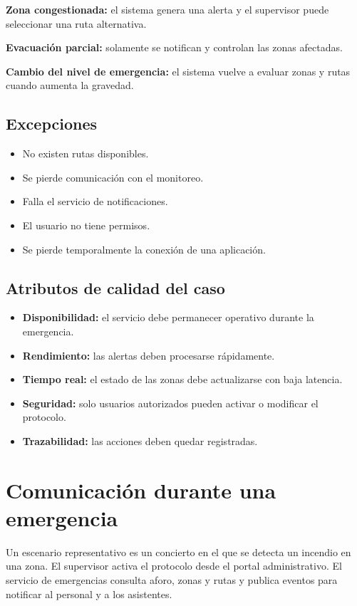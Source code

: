 \documentclass[12pt,a4paper]{article}
\begin{document}
\textbf{Zona congestionada:} el sistema genera una alerta y el supervisor puede seleccionar una ruta alternativa.

\textbf{Evacuación parcial:} solamente se notifican y controlan las zonas afectadas.

\textbf{Cambio del nivel de emergencia:} el sistema vuelve a evaluar zonas y rutas cuando aumenta la gravedad.

\subsection{Excepciones}

\begin{itemize}
\item No existen rutas disponibles.
\item Se pierde comunicación con el monitoreo.
\item Falla el servicio de notificaciones.
\item El usuario no tiene permisos.
\item Se pierde temporalmente la conexión de una aplicación.
\end{itemize}

\subsection{Atributos de calidad del caso}

\begin{itemize}
\item \textbf{Disponibilidad:} el servicio debe permanecer operativo durante la emergencia.
\item \textbf{Rendimiento:} las alertas deben procesarse rápidamente.
\item \textbf{Tiempo real:} el estado de las zonas debe actualizarse con baja latencia.
\item \textbf{Seguridad:} solo usuarios autorizados pueden activar o modificar el protocolo.
\item \textbf{Trazabilidad:} las acciones deben quedar registradas.
\end{itemize}

\section{Comunicación durante una emergencia}

Un escenario representativo es un concierto en el que se detecta un incendio en una zona. El supervisor activa el protocolo desde el portal administrativo. El servicio de emergencias consulta aforo, zonas y rutas y publica eventos para notificar al personal y a los asistentes.
\end{document}

